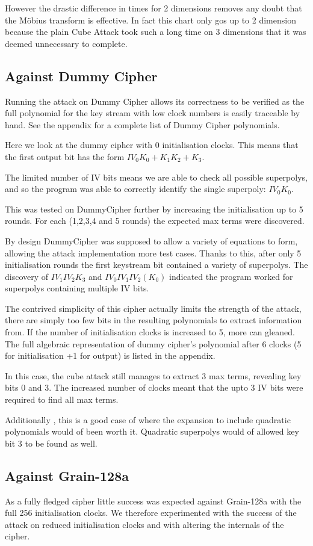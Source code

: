 \documentclass{report}
\let\Oldsubsection\subsection
\renewcommand{\subsection}{\FloatBarrier\Oldsubsection}
\begin{document}
However the drastic difference in times for 2 dimensions removes any doubt that the M\"{o}bius transform is effective. In fact this chart only gos up to 2 dimension because the plain Cube Attack took such a long time on 3 dimensions that it was deemed unnecessary to complete.
\subsection{Against Dummy Cipher}
Running the attack on Dummy Cipher allows its correctness to be verified as the full polynomial for the key stream with low clock numbers is easily traceable by hand. See the appendix for a complete list of Dummy Cipher polynomials.

Here we look at the dummy cipher with 0 initialisation clocks. This means that the first output bit has the form $IV_0K_0+K_1K_2+K_3$.

The limited number of IV bits means we are able to check all possible superpolys, and so the program was able to correctly identify the single superpoly: $IV_0K_0$.

This was tested on DummyCipher further by increasing the initialisation up to 5 rounds. For each (1,2,3,4 and 5 rounds) the expected max terms were discovered.

By design DummyCipher was supposed to allow a variety of equations to form, allowing the attack implementation more test cases. Thanks to this, after only 5 initialisation rounds the first keystream bit contained a variety of superpolys. The discovery of $IV_1IV_2K_3$ and $IV_0IV_1IV_2(K_0)$ indicated the program worked for superpolys containing multiple IV bits.

The contrived simplicity of this cipher actually limits the strength of the attack, there are simply too few bits in the resulting polynomials to extract information from. If the number of initialisation clocks is increased to 5, more can gleaned. The full algebraic representation of dummy cipher's polynomial after 6 clocks (5 for initialisation +1 for output) is listed in the appendix.

In this case, the cube attack still manages to extract 3 max terms, revealing key bits 0 and 3. The increased number of clocks meant that the upto 3 IV bits were required to find all max terms.

Additionally , this is a good case of where the expansion to include quadratic polynomials would of been worth it. Quadratic superpolys would of allowed key bit 3 to be found as well.
\subsection{Against Grain-128a}
As a fully fledged cipher little success was expected against Grain-128a with the full 256 initialisation clocks. We therefore experimented with the success of the attack on reduced initialisation clocks and with altering the internals of the cipher.
\end{document}
